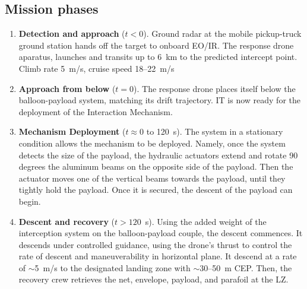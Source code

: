 \subsection{Mission phases}
\begin{enumerate}
    \item \textbf{Detection and approach} ($t < 0$). Ground radar at the mobile pickup-truck ground station hands off the target to onboard EO/IR. The response drone aparatus, launches and transits up to 6~km to the predicted intercept point. Climb rate 5~m/s, cruise speed 18--22~m/s 
    
    \item \textbf{Approach from below} ($t = 0$). The response drone places itself below the balloon-payload system, matching its drift trajectory. IT is now ready for the deployment of the Interaction Mechanism.
    
    \item \textbf{Mechanism Deployment} ($t \approx 0$ to 120~s). The system in a stationary condition allows the mechanism to be deployed. Namely, once the system detects the size of the payload, the hydraulic actuators extend and rotate 90 degrees the aluminum beams on the opposite side of the payload. Then the actuator moves one of the vertical beams towards the payload, until they tightly hold the payload. Once it is secured, the descent of the payload can begin. 
    
    
    \item \textbf{Descent and recovery} ($t > 120$~s). Using the added weight of the interception system on the balloon-payload couple, the descent commences. It descends under controlled guidance, using the drone's thrust to control the rate of descent and maneuverability in horizontal plane. It descend at a rate of $\sim$5~m/s to the designated landing zone with $\sim$30--50~m CEP. Then, the recovery crew retrieves the net, envelope, payload, and parafoil at the LZ.
\end{enumerate}


